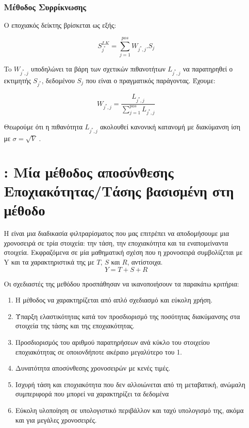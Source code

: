 \subsubsection{Μέθοδος Συρρίκνωσης }

Ο εποχιακός δείκτης  βρίσκεται ως εξής:

\[S_{j^*}^{LK} = \sum_{j=1}^{pos}W_{j^*,j} . S_j \]

To $W_{j^*,j}$ υποδηλώνει τα βάρη των σχετικών πιθανοτήτων $L_{j^*,j}$ να παρατηρηθεί ο εκτιμητής $S_{j^*}$, δεδομένου $S_j$ που είναι ο πραγματικός παράγοντας. Έχουμε:


\[W_{j^*,j} = \frac{L_{j^*,j}}{\sum_{j=1}^{pos}L_{j^*,j}} \]

Θεωρούμε ότι η πιθανότητα $L_{j^*,j}$ ακολουθεί κανονική κατανομή με διακύμανση ίση με $\sigma = \sqrt{V}$ .

\section{ : Μία μέθοδος αποσύνθεσης Εποχιακότητας/Τάσης βασισμένη στη μέθοδο }
H  είναι μια διαδικασία φιλτραρίσματος που μας επιτρέπει να αποδομήσουμε μια χρονοσειρά σε τρία στοιχεία: την τάση, την εποχιακότητα και τα εναπομείναντα στοιχεία. Εκφραζόμενα σε μία μαθηματική σχέση που η χρονοσειρά συμβολίζεται με Y και τα χαρακτηριστικά της με $T$, $S$ και $R$, αντίστοιχα. 
\[ Y = T + S + R\]

Οι σχεδιαστές της μεθόδου προσπάθησαν να ικανοποιήσουν τα παρακάτω κριτήρια:
\begin{enumerate}
  \item Η μέθοδος  να χαρακτηρίζεται από απλό σχεδιασμό και εύκολη χρήση.
  \item Ύπαρξη ελαστικότητας κατά τον προσδιορισμό της ποσότητας διακύμανσης στα στοιχεία της τάσης και της εποχιακότητας.
  \item Προσδιορισμός του αριθμού παρατηρήσεων ανά κύκλο του στοιχείου εποχιακότητας σε οποιονδήποτε ακέραιο μεγαλύτερο του 1. 
  \item Δυνατότητα αποσύνθεσης χρονοσειρών με κενές τιμές.
  \item Ισχυρή τάση και εποχιακότητα που δεν αλλοιώνεται από τη μεταβατική, ανώμαλη συμπεριφορά που μπορεί να χαρακτηρίζει τα δεδομένα
  \item Εύκολη υλοποίηση σε υπολογιστικό περιβάλλον και ταχύ υπολογισμό της, ακόμα και για μεγάλες χρονοσειρές.
\end{enumerate}

